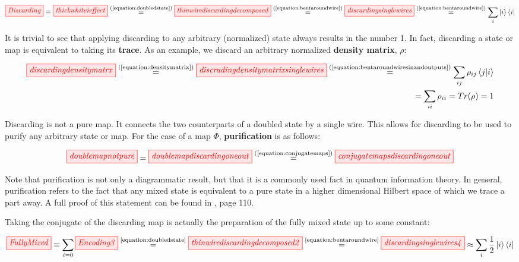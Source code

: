 \documentclass[]{article}
\newcommand{\equaltext}[1]{\ensuremath{\stackrel{\text{#1}}{=}}}
\begin{document}
\begin{equation}
\label{equation:discarding}
\tikzfig{Discarding} \equiv \tikzfig{thickwhiteieffect} \equaltext{(\ref{equation:doubledstate})} \tikzfig{thinwirediscardingdecomposed} 
\equaltext{(\ref{equation:bentaroundwire})}
 \tikzfig{discardingsinglewires} \equaltext{(\ref{equation:bentaroundwire})} \sum\limits_{i}\ket{i}\bra{i}
\end{equation}

It is trivial to see that applying discarding to any arbitrary (normalized) state always results in the number 1. In fact, discarding a state or map is equivalent to taking its \textbf{trace}. As an example, we discard an arbitrary normalized \textbf{density matrix}, $\rho$:

\begin{equation}
\label{equation:discardingstate}
\begin{split}
\tikzfig{discardingdensitymatrx} \equaltext{(\ref{equation:densitymatrix})} \tikzfig{discradingdensitymatrixsinglewires} \equaltext{(\ref{equation:bentaroundwiresinandoutputs})} \sum\limits_{ij} \rho_{ij} \bra{j}\ket{i} \\ = \sum\limits_{ii} \rho_{ii} = Tr(\rho) = 1
\end{split}
\end{equation}

Discarding is not a pure map. It connects the two counterparts of a doubled state by a single wire. This allows for discarding to be used to purify any arbitrary state or map. For the case of a map $\Phi$, \textbf{purification} is as follows:

\begin{equation}
\label{equation:Purification}
\tikzfig{doublemapnotpure} = \tikzfig{doublemapdiscardingoneout} \equaltext{(\ref{equation:conjugatemaps})} \tikzfig{conjugatemapsdiscardingoneout}
\end{equation}

Note that purification is not only a diagrammatic result, but that it is a commonly used fact in quantum information theory. In general, purification refers to the fact that any mixed state is equivalent to a pure state in a higher dimensional Hilbert space of which we trace a part away. A full proof of this statement can be found in \cite{Nielsen2011}, page 110.

Taking the conjugate of the discarding map is actually the preparation of the fully mixed state up to some constant:

\begin{equation}
	\label{equation:FullyMixed}
	\tikzfig{FullyMixed} \equiv \sum\limits_{i=0} \tikzfig{Encoding3} \equaltext{\ref{equation:doubledstate}} \tikzfig{thinwirediscardingdecomposed2}  \equaltext{\ref{equation:bentaroundwire}} \tikzfig{discardingsinglewires4} \approx \sum\limits_{i} \frac{1}{2} \ket{i} \bra{i}
\end{equation}
\end{document}
